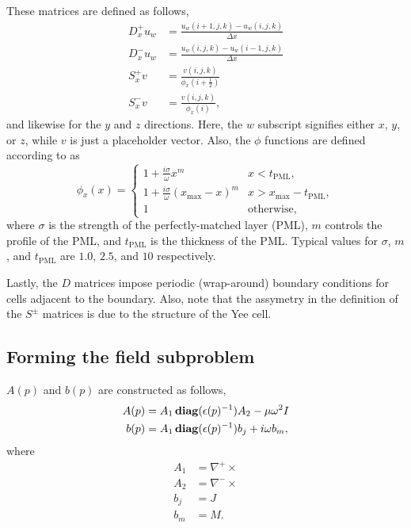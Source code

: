 \documentclass{article}
\begin{document}
\begin{appendix}
These matrices are defined as follows,
    \begin{subequations}\begin{align}
    D_x^+ u_w &= \frac{u_w(i+1,j,k) - u_w(i,j,k)}{\Delta x} \\
    D_x^- u_w &= \frac{u_w(i,j,k) - u_w(i-1,j,k)}{\Delta x} \\
    S_x^+ v &= \frac{v(i,j,k)}{\phi_x(i+\frac{1}{2})} \\
    S_x^- v &= \frac{v(i,j,k)}{\phi_x(i)}, 
    \end{align}\end{subequations}
    and likewise for the $y$ and $z$ directions.
Here, the $w$ subscript signifies either $x$, $y$, or $z$,
    while $v$ is just a placeholder vector.
Also, the $\phi$ functions are defined according to \cite{scpml} as
    \begin{equation}
    \phi_x(x) = \begin{cases}
        1 + \frac{i\sigma}{\omega} x^m & x < t_\text{PML}, \\ 
        1 + \frac{i\sigma}{\omega} (x_\text{max} -x)^m
            & x > x_\text{max} - t_\text{PML}, \\ 
        1 & \text{otherwise,}
        \end{cases}
    \end{equation}
    where $\sigma$ is the strength of the perfectly-matched layer (PML), 
    $m$ controls the profile of the PML,
    and $t_\text{PML}$ is the thickness of the PML.
Typical values for $\sigma$, $m$, and $t_\text{PML}$ are 
    $1.0$, $2.5$, and $10$ respectively.

Lastly, the $D$ matrices impose periodic (wrap-around) boundary conditions
    for cells adjacent to the boundary.
Also, note that the assymetry in the definition of the $S^\pm$ matrices
    is due to the structure of the Yee cell\cite{yee cell}.

\subsection{Forming the field subproblem}
$A(p)$ and $b(p)$ are constructed as follows,
    \begin{subequations}\begin{align}
    A(p) &= A_1 \mathop{\bf diag}(\epsilon(p)^{-1}) A_2 - \mu \omega^2 I \\
    b(p) &= A_1 \mathop{\bf diag}(\epsilon(p)^{-1}) b_j + i \omega b_m, \\
    \end{align}\end{subequations}
    where
    \begin{subequations}\begin{align}
    A_1 &= \nabla^+ \times \\
    A_2 &= \nabla^- \times \\
    b_j &= J \\
    b_m &= M.
    \end{align}\end{subequations}


\end{appendix}
\end{document}
